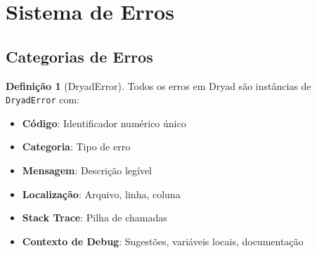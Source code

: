 \documentclass[12pt,a4paper]{article}
\theoremstyle{definition}
\newtheorem{definition}{Definição}[section]
\begin{document}
\section{Sistema de Erros}

\subsection{Categorias de Erros}

\begin{definition}[DryadError]
Todos os erros em Dryad são instâncias de \texttt{DryadError} com:

\begin{itemize}
    \item \textbf{Código}: Identificador numérico único
    \item \textbf{Categoria}: Tipo de erro
    \item \textbf{Mensagem}: Descrição legível
    \item \textbf{Localização}: Arquivo, linha, coluna
    \item \textbf{Stack Trace}: Pilha de chamadas
    \item \textbf{Contexto de Debug}: Sugestões, variáveis locais, documentação
\end{itemize}
\end{definition}
\end{document}
